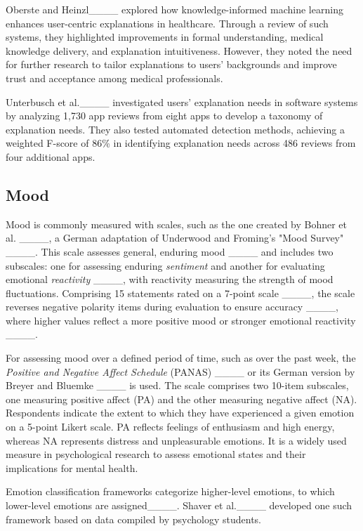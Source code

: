 Oberste and Heinzl____ explored how knowledge-informed machine learning enhances user-centric explanations in healthcare. Through a review of such systems, they highlighted improvements in formal understanding, medical knowledge delivery, and explanation intuitiveness. However, they noted the need for further research to tailor explanations to users’ backgrounds and improve trust and acceptance among medical professionals.

Unterbusch et al.____ investigated users' explanation needs in software systems by analyzing 1,730 app reviews from eight apps to develop a taxonomy of explanation needs. They also tested automated detection methods, achieving a weighted F-score of 86\% in identifying explanation needs across 486 reviews from four additional apps.

\subsection{Mood}
\label{sec:sentiment}
Mood is commonly measured with scales, such as the one created by Bohner et al. ____, a German adaptation of Underwood and Froming’s "Mood Survey" ____. This scale assesses general, enduring mood ____ and includes two subscales: one for assessing enduring \textit{sentiment} and another for evaluating emotional \textit{reactivity} ____, with reactivity measuring the strength of mood fluctuations. Comprising 15 statements rated on a 7-point scale ____, the scale reverses negative polarity items during evaluation to ensure accuracy ____, where higher values reflect a more positive mood or stronger emotional reactivity ____.

For assessing mood over a defined period of time, such as over the past week, the \textit{Positive and Negative Affect Schedule} (PANAS) ____ or its German version by Breyer and Bluemke ____ is used. The scale comprises two 10-item subscales, one measuring positive affect (PA) and the other measuring negative affect (NA). Respondents indicate the extent to which they have experienced a given emotion on a 5-point Likert scale. PA reflects feelings of enthusiasm and high energy, whereas NA represents distress and unpleasurable emotions. It is a widely used measure in psychological research to assess emotional states and their implications for mental health.

Emotion classification frameworks categorize higher-level emotions, to which lower-level emotions are assigned____. Shaver et al.____ developed one such framework based on data compiled by psychology students.